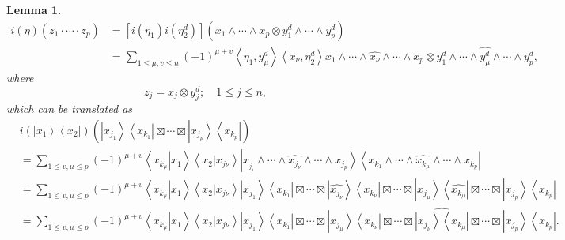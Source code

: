 \documentclass[aps,preprint]{revtex4}%
\newtheorem{lemma}[theorem]{Lemma}
\begin{document}
\begin{lemma}%
\begin{align}
i\left(  \eta\right)  \left(  z_{1}\cdot\cdots\cdot z_{p}\right)   &  =\left[
i\left(  \eta_{1}\right)  i\left(  \eta_{2}^{d}\right)  \right]  \left(
x_{1}\wedge\cdots\wedge x_{p}\otimes y_{1}^{d}\wedge\cdots\wedge y_{p}%
^{d}\right) \\
&  =\sum_{1\leq\mu,v\leq n}\left(  -1\right)  ^{\mu+v}\left\langle \eta
_{1},y_{\mu}^{d}\right\rangle \left\langle x_{\nu},\eta_{2}^{d}\right\rangle
x_{1}\wedge\cdots\wedge\widehat{x_{\nu}}\wedge\cdots\wedge x_{p}\otimes
y_{1}^{d}\wedge\cdots\wedge\widehat{y_{\mu}^{d}}\wedge\cdots\wedge y_{p}^{d},
\end{align}
where
\begin{equation}
z_{j}=x_{j}\otimes y_{j}^{d};\quad1\leq j\leq n,
\end{equation}
which can be translated as
\begin{align}
&  i\left(  \left\vert x_{1}\right\rangle \left\langle x_{2}\right\vert
\right)  \left(  \left\vert x_{j_{1}}\right\rangle \left\langle x_{k_{1}%
}\right\vert \boxtimes\cdots\boxtimes\left\vert x_{j_{p}}\right\rangle
\left\langle x_{k_{p}}\right\vert \right) \\
&  =\sum_{1\leq v,\mu\leq p}\left(  -1\right)  ^{\mu+v}\left\langle \left.
x_{k_{\mu}}\right\vert x_{1}\right\rangle \left\langle \left.  x_{2}%
\right\vert x_{j\nu}\right\rangle \left\vert x_{_{j_{1}}}\wedge\cdots
\wedge\widehat{x_{j_{\nu}}}\wedge\cdots\wedge x_{j_{p}}\right\rangle
\left\langle x_{k_{1}}\wedge\cdots\wedge\widehat{x_{k_{\mu}}}\wedge
\cdots\wedge x_{k_{p}}\right\vert \\
&  =\sum_{1\leq v,\mu\leq p}\left(  -1\right)  ^{\mu+v}\left\langle \left.
x_{k_{\mu}}\right\vert x_{1}\right\rangle \left\langle \left.  x_{2}%
\right\vert x_{j\nu}\right\rangle \left\vert x_{j_{1}}\right\rangle
\left\langle x_{k_{1}}\right\vert \boxtimes\cdots\boxtimes\left\vert
\widehat{x_{j_{\nu}}}\right\rangle \left\langle x_{k_{\nu}}\right\vert
\boxtimes\cdots\boxtimes\left\vert x_{j_{\mu}}\right\rangle \left\langle
\widehat{x_{k_{\mu}}}\right\vert \boxtimes\cdots\boxtimes\left\vert x_{j_{p}%
}\right\rangle \left\langle x_{k_{p}}\right\vert \\
&  =\sum_{1\leq v,\mu\leq p}\left(  -1\right)  ^{\mu+v}\left\langle \left.
x_{k_{\mu}}\right\vert x_{1}\right\rangle \left\langle \left.  x_{2}%
\right\vert x_{j\nu}\right\rangle \left\vert x_{j_{1}}\right\rangle
\left\langle x_{k_{1}}\right\vert \boxtimes\cdots\boxtimes\left\vert
x_{j_{\mu}}\right\rangle \left\langle x_{k_{\nu}}\right\vert \boxtimes
\cdots\boxtimes\widehat{\left\vert x_{j_{\nu}}\right\rangle \left\langle
x_{k_{\mu}}\right\vert }\boxtimes\cdots\boxtimes\left\vert x_{j_{p}%
}\right\rangle \left\langle x_{k_{p}}\right\vert .
\end{align}

\end{lemma}
\end{document}
